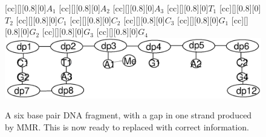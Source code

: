 \begin{figure}[h!]
[cc][][0.8][0]{${A_1}$}
[cc][][0.8][0]{${A_2}$}
[cc][][0.8][0]{${A_3}$}
[cc][][0.8][0]{${T_1}$}
[cc][][0.8][0]{${T_2}$}
[cc][][0.8][0]{${C_1}$}
[cc][][0.8][0]{${C_2}$}
[cc][][0.8][0]{${C_3}$}
[cc][][0.8][0]{${G_1}$}
[cc][][0.8][0]{${G_2}$}
[cc][][0.8][0]{${G_3}$}
[cc][][0.8][0]{${G_4}$}
  \centering
    \includegraphics[width=1.0\textwidth]{mmr/state7}
  \caption[A six base pair DNA fragment.]{A six base pair DNA fragment, with a gap in one strand produced by MMR. This is now ready to replaced with correct information.}
  \label{fig:state7}
\end{figure}


